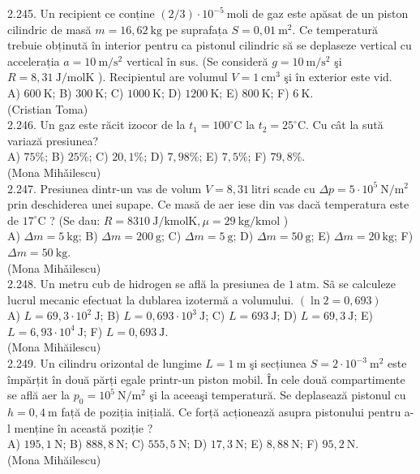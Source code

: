 2.245. Un recipient ce conține $(2 / 3) \cdot 10^{-5} \mathrm{~moli}$ de gaz este apăsat de un piston cilindric de masă $m=16,62 \mathrm{~kg}$ pe suprafața $S=0,01 \mathrm{~m}^{2}$. Ce temperatură trebuie obținută în interior pentru ca pistonul cilindric să se deplaseze vertical cu accelerația $a=10 \mathrm{~m} / \mathrm{s}^{2}$ vertical în sus. (Se consideră $g=10 \mathrm{~m} / \mathrm{s}^{2}$ şi $R=8,31 \mathrm{~J} / \mathrm{molK}$ ). Recipientul are volumul $V=1 \mathrm{~cm}^{3}$ şi în exterior este vid.\\ A) $600 \mathrm{~K}$; B) $300 \mathrm{~K}$; C) $1000 \mathrm{~K}$; D) $1200 \mathrm{~K}$; E) $800 \mathrm{~K}$; F) $6 \mathrm{~K}$.\\ (Cristian Toma)\\

2.246. Un gaz este răcit izocor de la $t_{1}=100^{\circ} \mathrm{C}$ la $t_{2}=25^{\circ} \mathrm{C}$. Cu cât la sută variază presiunea?\\ A) $75 \%$; B) $25 \%$; C) $20,1 \%$; D) $7,98 \%$; E) $7,5 \%$; F) $79,8 \%$.\\ (Mona Mihǎilescu)\\

2.247. Presiunea dintr-un vas de volum $V=8,31 \mathrm{~litri}$ scade cu $\Delta p=5 \cdot 10^{5} \mathrm{~N} / \mathrm{m}^{2}$ prin deschiderea unei supape. Ce masă de aer iese din vas dacă temperatura este de $17^{\circ} \mathrm{C}$ ? (Se dau: $R=8310 \mathrm{~J} / \mathrm{kmolK}, \mu=29 \mathrm{~kg} / \mathrm{kmol}$ )\\ A) $\Delta m=5 \mathrm{~kg}$; B) $\Delta m=200 \mathrm{~g}$; C) $\Delta m=5 \mathrm{~g}$; D) $\Delta m=50 \mathrm{~g}$; E) $\Delta m=20 \mathrm{~kg}$; F) $\Delta m=50 \mathrm{~kg}$.\\ (Mona Mihǎilescu)\\

2.248. Un metru cub de hidrogen se află la presiunea de $1 \mathrm{~atm}$. Sã se calculeze lucrul mecanic efectuat la dublarea izotermă a volumului. $(\ln 2=0,693)$\\ A) $L=69,3 \cdot 10^{2} \mathrm{~J}$; B) $L=0,693 \cdot 10^{3} \mathrm{~J}$; C) $L=693 \mathrm{~J}$; D) $L=69,3 \mathrm{~J}$; E) $L=6,93 \cdot 10^{4} \mathrm{~J}$; F) $L=0,693 \mathrm{~J}$.\\ (Mona Mihăilescu)\\

2.249. Un cilindru orizontal de lungime $L=1 \mathrm{~m}$ şi secțiunea $S=2 \cdot 10^{-3} \mathrm{~m}^{2}$ este împărțit în două părți egale printr-un piston mobil. În cele două compartimente se află aer la $p_{0}=10^{5} \mathrm{~N} / \mathrm{m}^{2}$ şi la aceeaşi temperatură. Se deplasează pistonul cu $h=0,4 \mathrm{~m}$ față de poziția inițială. Ce forță acționează asupra pistonului pentru a-l menține în această poziție ?\\ A) $195,1 \mathrm{~N}$; B) $888,8 \mathrm{~N}$; C) $555,5 \mathrm{~N}$; D) $17,3 \mathrm{~N}$; E) $8,88 \mathrm{~N}$; F) $95,2 \mathrm{~N}$.\\ (Mona Mihăilescu)\\

